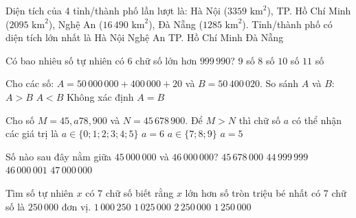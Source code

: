 \begin{ex} %
Diện tích của 4 tỉnh/thành phố lần lượt là: Hà Nội ($3359\text{ km}^2$), TP. Hồ Chí Minh ($2095\text{ km}^2$), Nghệ An ($16\,490\text{ km}^2$), Đà Nẵng ($1285\text{ km}^2$). Tỉnh/thành phố có diện tích lớn nhất là
\choice
{Hà Nội}
{\True Nghệ An}
{TP. Hồ Chí Minh}
{Đà Nẵng}
\end{ex}

\begin{ex} %
Có bao nhiêu số tự nhiên có 6 chữ số lớn hơn $999\,990$?
\choice
{\True $9$ số}
{$8$ số}
{$10$ số}
{$11$ số}
\end{ex}

\begin{ex} %
Cho các số: $A = 50\,000\,000 + 400\,000 + 20$ và $B = 50\,400\,020$. So sánh $A$ và $B$:
\choice
{$A > B$}
{$A < B$}
{Không xác định}
{\True $A = B$}
\end{ex}

\begin{ex} %
Cho số $M = 45,a78,900$ và $N = 45\,678\,900$. Để $M > N$ thì chữ số $a$ có thể nhận các giá trị là
\choice
{$a \in \{0; 1; 2; 3; 4; 5\}$}
{$a = 6$}
{\True $a \in \{7; 8; 9\}$}
{$a = 5$}
\end{ex}

\begin{ex} %
Số nào sau đây nằm giữa $45\,000\,000$ và $46\,000\,000$?
\choice
{\True $45\,678\,000$}
{$44\,999\,999$}
{$46\,000\,001$}
{$47\,000\,000$}
\end{ex}

\begin{ex} %
Tìm số tự nhiên $x$ có 7 chữ số biết rằng $x$ lớn hơn số tròn triệu bé nhất có 7 chữ số là $250\,000$ đơn vị.
\choice
{$1\,000\,250$}
{$1\,025\,000$}
{$2\,250\,000$}
{\True $1\,250\,000$}
\end{ex}


